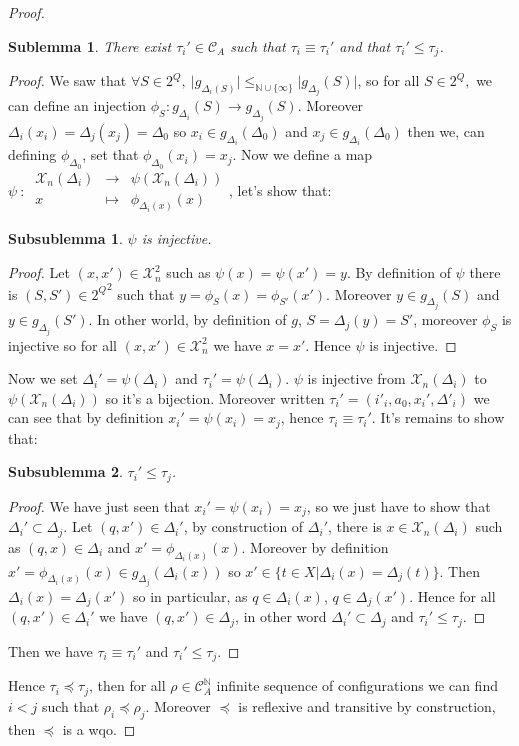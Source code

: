 \documentclass[a4paper,10pt]{report}
\newtheorem{slm}{Sublemma}[lm]
\newtheorem{sslm}{Subsublemma}[slm]
\newcommand{\dmap}[5]{
#1~:~\begin{array}{ccccc}
#2 &\to& #3 \\
#4  &\mapsto& #5
\end{array}}
\newcommand{\C}{\mathcal{C}_{A}}
\newcommand{\X}{\mathcal{X}_{n}}
\begin{document}
\begin {proof}
\begin{slm}
  There exist $\tau_i' \in \C$ such that $\tau_i \equiv \tau_i'$ and that  $\tau_i' \leq \tau_j$.
\end{slm}
\begin{proof}
We saw that $\forall S \in 2^Q,\ \lvert g_{\Delta_i(S)} \lvert \leq_{\mathbb N \cup \{\infty\}} \lvert g_{\Delta_j}(S) \lvert$, 
so for all $S \in 2^Q,$ we can define an injection $\phi_S: g_{\Delta_i}(S) \to g_{\Delta_j}(S)$. 
Moreover $\Delta_i(x_i)=\Delta_j(x_j)=\Delta_0$ so $x_i \in g_{\Delta_i}(\Delta_0)$ and $x_j \in g_{\Delta_i}(\Delta_0) $ then we, can defining $\phi_{\Delta_0}$, set that $\phi_{\Delta_0}(x_i)=x_j$.
Now we define a map $\dmap{\psi}{\X(\Delta_i)}{\psi(\X(\Delta_i))}{x}{\phi_{\Delta_i(x)}(x)}$, let's show that:
\begin{sslm}
  $\psi$ is injective.
\end{sslm}
\begin{proof}
Let $(x,x') \in \X^2$ such as $\psi(x)=\psi(x')=y$.
By definition of $\psi$ there is $(S,S')\in {2^Q}^2$ such that  $y=\phi_S(x)=\phi_{S'}(x')$. Moreover $y\in g_{\Delta_j}(S)$ and  $y\in g_{\Delta_j}(S')$. In other world, by definition of $g$,
$S=\Delta_j(y)=S'$, moreover $\phi_S$ is injective so for all $(x,x') \in \X^2 $ we have $ x=x'$.
Hence $\psi$ is injective.
\end{proof}
Now we set $\Delta_i'=\psi (\Delta_i)$ and $\tau_i'=\psi (\Delta_i)$.
$\psi$ is injective from $\X(\Delta_i)$ to $\psi(\X(\Delta_i))$ so it's a bijection.
Moreover written $ \tau_i'=(i'_i,a_0,x_i',\Delta'_i)$ we can see that by definition $ x_i'=\psi(x_i)=x_j$, hence $\tau_i \equiv \tau_i'$.
It's remains to show that:
\begin{sslm}
  $\tau_i' \leq \tau_j$.
\end{sslm}

\begin{proof}
  We have just seen that $ x_i'=\psi(x_i)=x_j$, so we just have to show that $\Delta_i' \subset \Delta_j$.
  Let $(q,x') \in \Delta_i'$, by construction of $\Delta_i'$, there is $x \in \X(\Delta_i)$ such as $(q,x) \in \Delta_i$ and $x'=\phi_{\Delta_i(x)}(x)$.
  Moreover by definition $x'=\phi_{\Delta_i(x)}(x) \in g_{\Delta_j}(\Delta_i(x))$ so $ x' \in \{ t \in X | \Delta_i(x)=\Delta_j(t) \}$.
  Then $\Delta_i(x)=\Delta_j(x')$ so in particular, as $q \in \Delta_i(x)$, $q \in \Delta_j(x')$.
  Hence for all $(q,x') \in \Delta_i'$ we have $(q,x') \in \Delta_j$, in other word $\Delta_i' \subset \Delta_j$ and $\tau_i' \leq \tau_j$.
\end{proof}
Then we have $\tau_i \equiv \tau_i'$ and  $\tau_i' \leq \tau_j$.
\end{proof}	
Hence $\tau_i \preceq \tau_j$, then for all $\rho \in \C^{\mathbb N}$ infinite sequence of configurations we can find $i < j$ such that $\rho_i \preceq \rho_j$.
Moreover $\preceq$ is reflexive and transitive by construction, then $\preceq$ is a wqo.

\end{proof}
\end{document}
